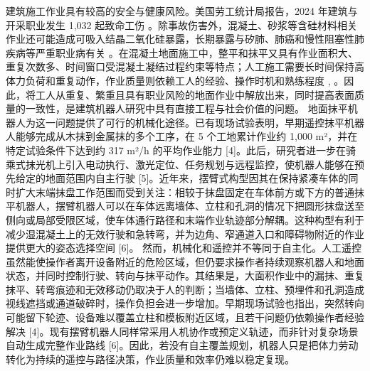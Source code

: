 \markdownRendererDocumentBegin
\markdownRendererSectionBegin
{}\markdownRendererParagraphSeparator
{}建筑施工作业具有较高的安全与健康风险。美国劳工统计局报告，2024 年建筑与开采职业发生 1,032 起致命工伤 。除事故伤害外，混凝土、砂浆等含硅材料相关作业还可能造成可吸入结晶二氧化硅暴露，长期暴露与矽肺、肺癌和慢性阻塞性肺疾病等严重职业病有关 。在混凝土地面施工中，整平和抹平又具有作业面积大、重复次数多、时间窗口受混凝土凝结过程约束等特点；人工施工需要长时间保持高体力负荷和重复动作，作业质量则依赖工人的经验、操作时机和熟练程度 , 。因此，将工人从重复、繁重且具有职业风险的地面作业中解放出来，同时提高表面质量的一致性，是建筑机器人研究中具有直接工程与社会价值的问题。\markdownRendererParagraphSeparator
{}地面抹平机器人为这一问题提供了可行的机械化途径。已有现场试验表明，早期遥控抹平机器人能够完成从木抹到金属抹的多个工序，在 5 个工地累计作业约 1,000 m²，并在特定试验条件下达到约 317 m²/h 的平均作业能力 [4]。此后，研究者进一步在骑乘式抹光机上引入电动执行、激光定位、任务规划与远程监控，使机器人能够在预先给定的地面范围内自主行驶 [5]。近年来，摆臂式构型因其在保持紧凑车体的同时扩大末端抹盘工作范围而受到关注：相较于抹盘固定在车体前方或下方的普通抹平机器人，摆臂机器人可以在车体远离墙体、立柱和孔洞的情况下把圆形抹盘送至侧向或局部受限区域，使车体通行路径和末端作业轨迹部分解耦。这种构型有利于减少湿混凝土上的无效行驶和急转弯，并为边角、窄通道入口和障碍物附近的作业提供更大的姿态选择空间 [6]。\markdownRendererParagraphSeparator
{}\markdownRendererParagraphSeparator
{}然而，机械化和遥控并不等同于自主化。人工遥控虽然能使操作者离开设备附近的危险区域，但仍要求操作者持续观察机器人和地面状态，并同时控制行驶、转向与抹平动作。其结果是，大面积作业中的漏抹、重复抹平、转弯痕迹和无效移动仍取决于人的判断；当墙体、立柱、预埋件和孔洞造成视线遮挡或通道破碎时，操作负担会进一步增加。早期现场试验也指出，突然转向可能留下轮迹、设备难以覆盖立柱和模板附近区域，且若干问题仍依赖操作者经验解决 [4]。现有摆臂机器人同样常采用人机协作或预定义轨迹，而非针对复杂场景自动生成完整作业路线 [6]。因此，若没有自主覆盖规划，机器人只是把体力劳动转化为持续的遥控与路径决策，作业质量和效率仍难以稳定复现。\markdownRendererParagraphSeparator
